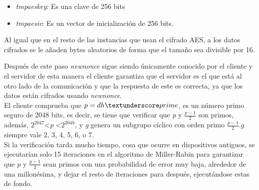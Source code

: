 \begin{enumerate}
\begin{itemize}
\begin{itemize}
				\begin{itemize}
					\item \emph{tmp\textunderscore aes\textunderscore key}: Es una clave de 256 bits
					\item \emph{tmp\textunderscore aes\textunderscore iv}: Es un vector de inicialización de 256 bits.
				\end{itemize}
				Al igual que en el resto de las instancias que usan el cifrado AES, a los datos cifrados se le añaden bytes aleatorios de forma que el tamaño sea divisible por 16.
			\end{itemize}
		\end{itemize}
	Después de este paso \emph{new\textunderscore nonce} sigue siendo únicamente conocido por el cliente y el servidor de esta manera el cliente garantiza que el servidor es el que está al otro lado de la comunicación y que la respuesta de este es correcta, ya que los datos están cifrados usando \emph{new\textunderscore nonce}.\\
	El cliente comprueba que $p=dh\textunderscore prime$, es un número primo seguro de 2048 bits, es decir, se tiene que verificar que \emph{p} y $\frac{p-1}{2}$ son primos, además, $2^{2047}$\textless \emph{p} \textless $2^{2048}$, y \emph{g} genera un subgrupo cíclico con orden primo $\frac{p-1}{2}$.$g$ siempre vale 2, 3, 4, 5, 6, o 7.\\
	Si la verificación tarda mucho tiempo, cosa que ocurre en dispositivos antiguos, se ejecutarían solo 15 iteraciones en el algoritmo de Miller-Rabin para garantizar que \emph{p} y $\frac{p-1}{2}$ sean primos con una probabilidad de error muy baja, alrededor de una millonésima, y dejar el resto de iteraciones para después, ejecutándose estas de fondo.


\end{enumerate}
